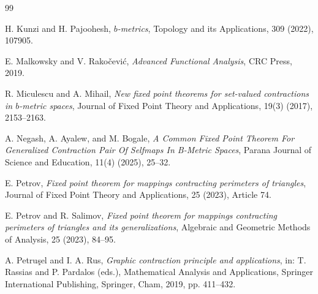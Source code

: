 \documentclass[a4paper,12pt,oneside]{article}
\numberwithin{equation}{section}
\begin{document}
\begin{thebibliography}{99}



H. Kunzi and H. Pajoohesh, \textit{$b$-metrics}, Topology and its Applications, 309 (2022), 107905.

E. Malkowsky and V. Rakočević, \textit{Advanced Functional Analysis}, CRC Press, 2019.

R. Miculescu and A. Mihail, \textit{New fixed point theorems for set-valued contractions in $b$-metric spaces}, Journal of Fixed Point Theory and Applications, 19(3) (2017), 2153--2163.


A. Negash, A. Ayalew, and M. Bogale, \textit{A Common Fixed Point Theorem For Generalized Contraction Pair Of Selfmaps In B-Metric Spaces}, Parana Journal of Science and Education, 11(4) (2025), 25--32. 

E. Petrov, \textit{Fixed point theorem for mappings contracting perimeters of triangles}, Journal of Fixed Point Theory and Applications, 25 (2023), Article 74.

E. Petrov and R. Salimov, \textit{Fixed point theorem for mappings contracting perimeters of triangles and its generalizations}, Algebraic and Geometric Methods of Analysis, 25 (2023), 84--95.



A. Petruşel and I. A. Rus, \textit{Graphic contraction principle and applications}, in: T. Rassias and P. Pardalos (eds.), Mathematical Analysis and Applications,  Springer International Publishing, Springer, Cham, 2019, pp. 411--432.


\end{thebibliography}
\end{document}
